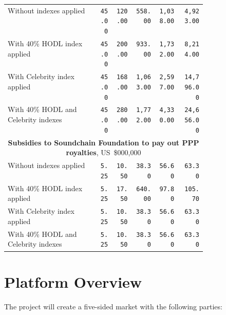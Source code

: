 \documentclass[12pt]{report}
\begin{document}
\begin{table}[H]
\begin{tabular}{p{0.45\linewidth}rrrrr}
Without indexes applied & 
\texttt{45.00} & \texttt{120.00} & \texttt{558.00} & \texttt{1,038.00} & \texttt{4,923.00} \\
With 40\% HODL index applied & 
\texttt{45.00} & \texttt{200.00} & \texttt{933.00} & \texttt{1,732.00} & \texttt{8,214.00} \\
With Celebrity index applied & 
\texttt{45.00} & \texttt{168.00} & \texttt{1,063.00} & \texttt{2,597.00} & \texttt{14,796.00} \\
With 40\% HODL and Celebrity indexes & 
\texttt{45.00} & \texttt{280.00} & \texttt{1,772.00} & \texttt{4,330.00} & \texttt{24,656.00} \\

\midrule
\multicolumn{6}{c}{\textbf{Subsidies to Soundchain Foundation to pay out PPP royalties}, US~\$000,000} \\
\midrule

Without indexes applied & 
\texttt{5.25} & \texttt{10.50} & \texttt{38.30} & \texttt{56.60} & \texttt{63.30} \\
With 40\% HODL index applied & 
\texttt{5.25} & \texttt{17.50} & \texttt{640.00} & \texttt{97.80} & \texttt{105.70} \\
With Celebrity index applied & 
\texttt{5.25} & \texttt{10.50} & \texttt{38.30} & \texttt{56.60} & \texttt{63.30} \\
With 40\% HODL and Celebrity indexes & 
\texttt{5.25} & \texttt{10.50} & \texttt{38.30} & \texttt{56.60} & \texttt{63.30} \\

\end{tabular}
\end{table}

\chapter{Platform Overview}
\label{platform}

The project will create a five-sided market with the following parties:
 
\end{document}
